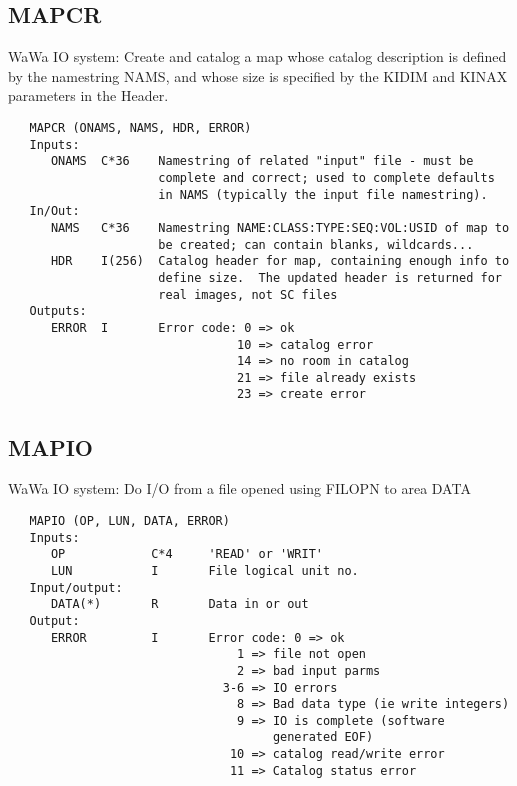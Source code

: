 \subsection{MAPCR}
WaWa IO system: Create and catalog a map whose catalog description
is defined by the namestring NAMS, and whose size is specified by
the KIDIM and KINAX parameters in the Header.
\begin{verbatim}
   MAPCR (ONAMS, NAMS, HDR, ERROR)
   Inputs:
      ONAMS  C*36    Namestring of related "input" file - must be
                     complete and correct; used to complete defaults
                     in NAMS (typically the input file namestring).
   In/Out:
      NAMS   C*36    Namestring NAME:CLASS:TYPE:SEQ:VOL:USID of map to
                     be created; can contain blanks, wildcards...
      HDR    I(256)  Catalog header for map, containing enough info to
                     define size.  The updated header is returned for
                     real images, not SC files
   Outputs:
      ERROR  I       Error code: 0 => ok
                                10 => catalog error
                                14 => no room in catalog
                                21 => file already exists
                                23 => create error

\end{verbatim}

\subsection{MAPIO}
WaWa IO system: Do I/O from a file opened using FILOPN to area DATA
\begin{verbatim}
   MAPIO (OP, LUN, DATA, ERROR)
   Inputs:
      OP            C*4     'READ' or 'WRIT'
      LUN           I       File logical unit no.
   Input/output:
      DATA(*)       R       Data in or out
   Output:
      ERROR         I       Error code: 0 => ok
                                1 => file not open
                                2 => bad input parms
                              3-6 => IO errors
                                8 => Bad data type (ie write integers)
                                9 => IO is complete (software
                                     generated EOF)
                               10 => catalog read/write error
                               11 => Catalog status error

\end{verbatim}

